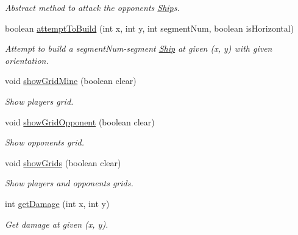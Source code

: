 \begin{DoxyCompactItemize}
\begin{DoxyCompactList}\small\item\em Abstract method to attack the opponent\textquotesingle{}s \hyperlink{classShip}{Ship}\textquotesingle{}s. \end{DoxyCompactList}\item 
boolean \hyperlink{classPlayer_a21c42ba135673c82075eebb3f9ea6d5c}{attempt\+To\+Build} (int x, int y, int segment\+Num, boolean is\+Horizontal)
\begin{DoxyCompactList}\small\item\em Attempt to build a segment\+Num-\/segment \hyperlink{classShip}{Ship} at given (x, y) with given orientation. \end{DoxyCompactList}\item 
void \hyperlink{classPlayer_ae551f266c116f22887d278f6beaf9e75}{show\+Grid\+Mine} (boolean clear)
\begin{DoxyCompactList}\small\item\em Show player\textquotesingle{}s grid. \end{DoxyCompactList}\item 
void \hyperlink{classPlayer_ade7e5623438ad21421091dcc201b367c}{show\+Grid\+Opponent} (boolean clear)
\begin{DoxyCompactList}\small\item\em Show opponent\textquotesingle{}s grid. \end{DoxyCompactList}\item 
void \hyperlink{classPlayer_ad571760f9739182566e3817e515fd3c1}{show\+Grids} (boolean clear)
\begin{DoxyCompactList}\small\item\em Show player\textquotesingle{}s and opponent\textquotesingle{}s grids. \end{DoxyCompactList}\item 
int \hyperlink{classPlayer_ac4e41793e0e2fd8cfaabad6775cdfaa0}{get\+Damage} (int x, int y)
\begin{DoxyCompactList}\small\item\em Get damage at given (x, y). \end{DoxyCompactList}\end{DoxyCompactItemize}
